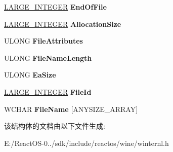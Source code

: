 \begin{DoxyCompactItemize}
\hyperlink{union___l_a_r_g_e___i_n_t_e_g_e_r}{L\+A\+R\+G\+E\+\_\+\+I\+N\+T\+E\+G\+ER} {\bfseries End\+Of\+File}
\item 
\mbox{\label{struct___f_i_l_e___i_d___f_u_l_l___d_i_r_e_c_t_o_r_y___i_n_f_o_r_m_a_t_i_o_n_a1eb4818b6c6d8c237e19e2a90deea2c0}} 
\hyperlink{union___l_a_r_g_e___i_n_t_e_g_e_r}{L\+A\+R\+G\+E\+\_\+\+I\+N\+T\+E\+G\+ER} {\bfseries Allocation\+Size}
\item 
\mbox{\label{struct___f_i_l_e___i_d___f_u_l_l___d_i_r_e_c_t_o_r_y___i_n_f_o_r_m_a_t_i_o_n_abab4f81ebc472d4b0811852ecfb67982}} 
U\+L\+O\+NG {\bfseries File\+Attributes}
\item 
\mbox{\label{struct___f_i_l_e___i_d___f_u_l_l___d_i_r_e_c_t_o_r_y___i_n_f_o_r_m_a_t_i_o_n_ae151a49a19ced8ba4f6ce94ea355ee55}} 
U\+L\+O\+NG {\bfseries File\+Name\+Length}
\item 
\mbox{\label{struct___f_i_l_e___i_d___f_u_l_l___d_i_r_e_c_t_o_r_y___i_n_f_o_r_m_a_t_i_o_n_a2cca880fe40c65df97ccbc5c8a5c5dc9}} 
U\+L\+O\+NG {\bfseries Ea\+Size}
\item 
\mbox{\label{struct___f_i_l_e___i_d___f_u_l_l___d_i_r_e_c_t_o_r_y___i_n_f_o_r_m_a_t_i_o_n_a7fc879085b5c2a2b145496d328fdf969}} 
\hyperlink{union___l_a_r_g_e___i_n_t_e_g_e_r}{L\+A\+R\+G\+E\+\_\+\+I\+N\+T\+E\+G\+ER} {\bfseries File\+Id}
\item 
\mbox{\label{struct___f_i_l_e___i_d___f_u_l_l___d_i_r_e_c_t_o_r_y___i_n_f_o_r_m_a_t_i_o_n_ad5c139c0967e2759c4223796cb2cec0b}} 
W\+C\+H\+AR {\bfseries File\+Name} \mbox{[}A\+N\+Y\+S\+I\+Z\+E\+\_\+\+A\+R\+R\+AY\mbox{]}
\end{DoxyCompactItemize}


该结构体的文档由以下文件生成\+:\begin{DoxyCompactItemize}
\item 
E\+:/\+React\+O\+S-\/0../sdk/include/reactos/wine/winternl.\+h\end{DoxyCompactItemize}
